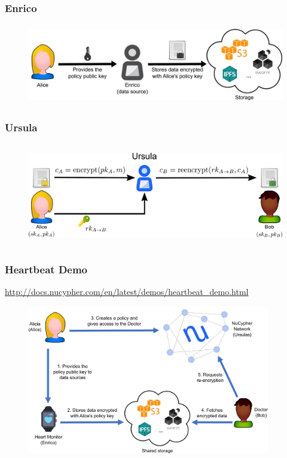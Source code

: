 \documentclass[xetex,mathsans,sans,aspectratio=169]{beamer}
\begin{document}
    \begin{frame}
      \frametitle{Enrico}
      \begin{figure}
        \centering
        \includegraphics[height=3.5cm]{pdf/enrico.png}
      \end{figure}
    \end{frame}

    \begin{frame}
      \frametitle{Ursula}
      \begin{figure}
        \centering
        \includegraphics[height=4.5cm]{pdf/ursula.png}
      \end{figure}
    \end{frame}

    \begin{frame}
        \frametitle{Heartbeat Demo}
        \url{http://docs.nucypher.com/en/latest/demos/heartbeat_demo.html}
        \begin{figure}
            \centering
            \includegraphics[height=6.5cm]{pdf/heartbeat_demo_overview.png}
        \end{figure}
    \end{frame}
\end{document}
